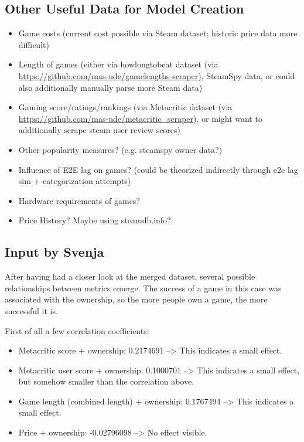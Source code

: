 \subsection{Other Useful Data for Model Creation}

\begin{itemize}
	\item Game costs (current cost possible via Steam dataset; historic price data more difficult)
	\item Length of games (either via howlongtobeat dataset (via \url{https://github.com/mas-ude/gamelengths-scraper}), SteamSpy data, or could also additionally manually parse more Steam data)
	\item Gaming score/ratings/rankings (via Metacritic dataset (via \url{https://github.com/mas-ude/metacritic_scraper}), or might want to additionally scrape steam user review scores)
	\item Other popularity measures? (e.g. steamspy owner data?)
	\item Influence of E2E lag on games? (could be theorized indirectly through e2e lag sim + categorization attempts)
	\item Hardware requirements of games?

	\item Price History? Maybe using steamdb.info?
\end{itemize}

\subsection{Input by Svenja}

After having had a closer look at the merged dataset, several possible relationships between metrics emerge. The success of a game in this case was associated with the ownership, so the more people own a game, the more successful it is.

First of all a few correlation coefficients:
\begin{itemize}
	\item Metacritic score + ownership: 0.2174691 --> This indicates a small effect.
	\item Metacritic user score + ownership: 0.1000701 --> This indicates a small effect, but somehow smaller than the correlation above.
	\item Game length (combined length) + ownership: 0.1767494 --> This indicates a small effect. 
	\item Price + ownership: -0.02796098 --> No effect visible.
\end{itemize}

